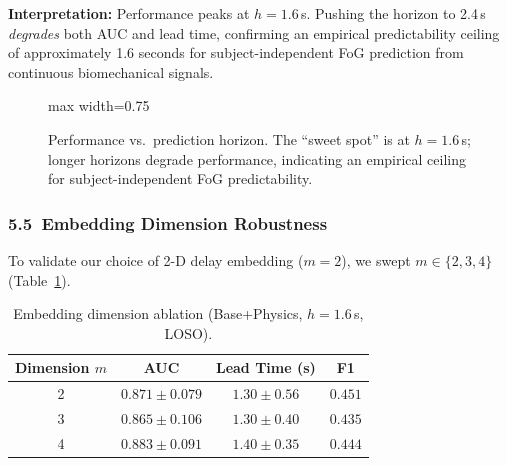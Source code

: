 \documentclass[12pt,a4paper]{article}
\begin{document}
\vspace{4pt}
\noindent\textbf{Interpretation:} Performance peaks at $h=1.6$\,s. Pushing the horizon to
2.4\,s \emph{degrades} both AUC and lead time, confirming an empirical predictability ceiling
of approximately 1.6 seconds for subject-independent FoG prediction from continuous
biomechanical signals.

\begin{figure}[ht]
\centering
\begin{adjustbox}{max width=0.75\textwidth}
\end{adjustbox}
\caption{Performance vs.\ prediction horizon. The ``sweet spot'' is at $h=1.6$\,s; longer
horizons degrade performance, indicating an empirical ceiling for subject-independent FoG
predictability.}
\label{fig:horizon}
\end{figure}

\newpage
\subsubsection*{5.5\ Embedding Dimension Robustness}

To validate our choice of 2-D delay embedding ($m=2$), we swept
$m \in \{2, 3, 4\}$ (Table~\ref{tab:embed}).

\begin{table}[ht]
\centering
\caption{Embedding dimension ablation (Base+Physics, $h=1.6$\,s, LOSO).}
\label{tab:embed}
\renewcommand{\arraystretch}{1.25}
\begin{tabular}{cccc}
\toprule
\textbf{Dimension $m$} & \textbf{AUC} & \textbf{Lead Time (s)} & \textbf{F1} \\
\midrule
2 & $0.871 \pm 0.079$ & $1.30 \pm 0.56$ & $\mathbf{0.451}$ \\
3 & $0.865 \pm 0.106$ & $1.30 \pm 0.40$ & $0.435$ \\
4 & $\mathbf{0.883 \pm 0.091}$ & $\mathbf{1.40 \pm 0.35}$ & $0.444$ \\
\bottomrule
\end{tabular}
\end{table}
\end{document}
